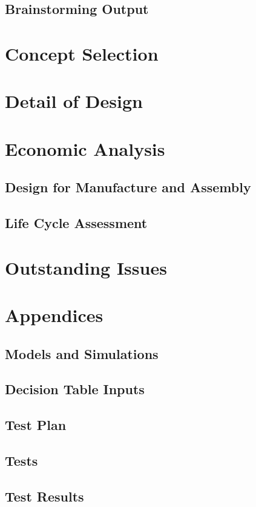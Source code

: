 \documentclass{article}
\begin{document}
\subsection{Brainstorming Output}


\section{Concept Selection}


\section{Detail of Design}

\section{Economic Analysis}
\subsection{Design for Manufacture and Assembly}

\subsection{Life Cycle Assessment}


\section{Outstanding Issues}

\section{Appendices}
\subsection{Models and Simulations}
\subsection{Decision Table Inputs}
\subsection{Test Plan}

\subsection{Tests}

\subsection{Test Results}
\end{document}
